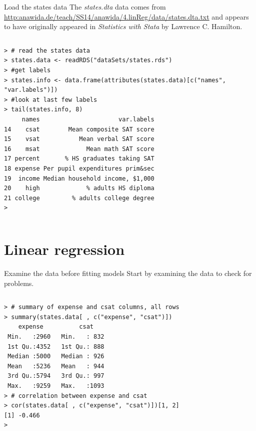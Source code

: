 \documentclass[table,smaller]{beamer}
\begin{document}
\begin{frame}[fragile,label=sec-1-5]{Load the states data}
 The \emph{states.dta} data comes from \url{http:anawida.de/teach/SS14/anawida/4.linReg/data/states.dta.txt} and appears to have originally appeared in \emph{Statistics with Stata} by Lawrence C. Hamilton.
\vspace{-.5em}
\begin{columns}
\begin{block}{}
\begin{verbatim}
> # read the states data
> states.data <- readRDS("dataSets/states.rds") 
> #get labels
> states.info <- data.frame(attributes(states.data)[c("names", "var.labels")])
> #look at last few labels
> tail(states.info, 8)
     names                      var.labels
14    csat        Mean composite SAT score
15    vsat           Mean verbal SAT score
16    msat             Mean math SAT score
17 percent       % HS graduates taking SAT
18 expense Per pupil expenditures prim&sec
19  income Median household income, $1,000
20    high             % adults HS diploma
21 college         % adults college degree
>
\end{verbatim}
\end{block}
\end{columns}
\vspace{.5em}
\end{frame}


\section{Linear regression}
\label{sec-2}

\begin{frame}[fragile,label=sec-2-1]{Examine the data before fitting models}
 Start by examining the data to check for problems.

\vspace{-.5em}
\begin{columns}
\begin{block}{}
\begin{verbatim}
> # summary of expense and csat columns, all rows
> summary(states.data[ , c("expense", "csat")]) 
    expense          csat     
 Min.   :2960   Min.   : 832  
 1st Qu.:4352   1st Qu.: 888  
 Median :5000   Median : 926  
 Mean   :5236   Mean   : 944  
 3rd Qu.:5794   3rd Qu.: 997  
 Max.   :9259   Max.   :1093  
> # correlation between expense and csat
> cor(states.data[ , c("expense", "csat")])[1, 2] 
[1] -0.466
>
\end{verbatim}
\end{block}
\end{columns}
\vspace{.5em}
\end{frame}
\end{document}
